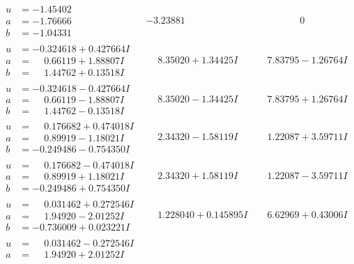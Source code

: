 \documentclass[1p]{elsarticle_modified}
\theoremstyle{definition}
\begin{document}
$$\begin{array}{c|c|c}
\begin{aligned}
u &= -1.45402\phantom{ +0.000000I} \\
a &= -1.76666\phantom{ +0.000000I} \\
b &= -1.04331\phantom{ +0.000000I}\end{aligned}
 & -3.23881\phantom{ +0.000000I} & \phantom{-0.000000 } 0 \\ \hline\begin{aligned}
u &= -0.324618 + 0.427664 I \\
a &= \phantom{-}0.66119 + 1.88807 I \\
b &= \phantom{-}1.44762 + 0.13518 I\end{aligned}
 & \phantom{-}8.35020 + 1.34425 I & \phantom{-}7.83795 - 1.26764 I \\ \hline\begin{aligned}
u &= -0.324618 - 0.427664 I \\
a &= \phantom{-}0.66119 - 1.88807 I \\
b &= \phantom{-}1.44762 - 0.13518 I\end{aligned}
 & \phantom{-}8.35020 - 1.34425 I & \phantom{-}7.83795 + 1.26764 I \\ \hline\begin{aligned}
u &= \phantom{-}0.176682 + 0.474018 I \\
a &= \phantom{-}0.89919 - 1.18021 I \\
b &= -0.249486 - 0.754350 I\end{aligned}
 & \phantom{-}2.34320 - 1.58119 I & \phantom{-}1.22087 + 3.59711 I \\ \hline\begin{aligned}
u &= \phantom{-}0.176682 - 0.474018 I \\
a &= \phantom{-}0.89919 + 1.18021 I \\
b &= -0.249486 + 0.754350 I\end{aligned}
 & \phantom{-}2.34320 + 1.58119 I & \phantom{-}1.22087 - 3.59711 I \\ \hline\begin{aligned}
u &= \phantom{-}0.031462 + 0.272546 I \\
a &= \phantom{-}1.94920 - 2.01252 I \\
b &= -0.736009 + 0.023221 I\end{aligned}
 & \phantom{-}1.228040 + 0.145895 I & \phantom{-}6.62969 + 0.43006 I \\ \hline\begin{aligned}
u &= \phantom{-}0.031462 - 0.272546 I \\
a &= \phantom{-}1.94920 + 2.01252 I \\

\end{aligned}
\end{array}$$
\end{document}
